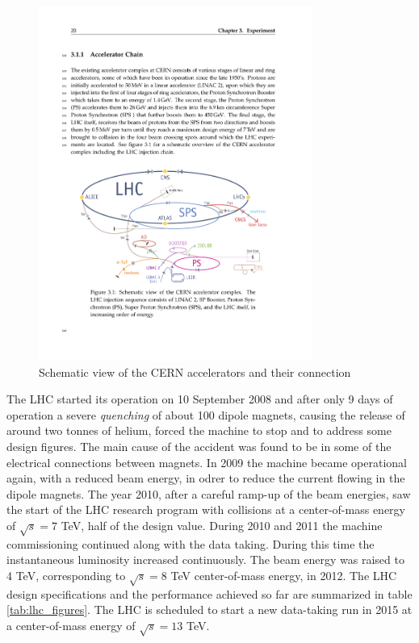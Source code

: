 \begin{figure}
\begin{center}
\includegraphics[angle=-0,width=0.8\textwidth]{2_LHC_and_CMS/pics/LHC.pdf}
\caption{Schematic view of the CERN accelerators and their connection
\label{fig:cern_accelerators}
}
\end{center}
\end{figure}

The LHC started its operation on 10 September 2008 and after only 9 days of operation a severe \emph{quenching} of about 100 dipole magnets, causing the release of around two tonnes of helium, forced the machine to stop and to address some design figures. The main cause of the accident was found to be in some of the electrical connections between magnets. In 2009 the machine became operational again, with a reduced beam energy, in odrer to reduce the current flowing in the dipole magnets. The year 2010, after a careful ramp-up of the beam energies, saw the start of the LHC research program with collisions at a center-of-mass energy of $\sqrt{s} = 7$ TeV, half of the design value. During 2010 and 2011 the machine commissioning continued along with the data taking. During this time the instantaneous luminosity increased continuously. The beam energy was raised to 4 TeV, corresponding to $\sqrt{s} = 8$ TeV center-of-mass energy, in 2012. The LHC design specifications and the performance achieved so far are summarized in table \ref{tab:lhc_figures}. The LHC is scheduled to start a new data-taking run in 2015 at a center-of-mass energy of $\sqrt{s} = 13$ TeV.

